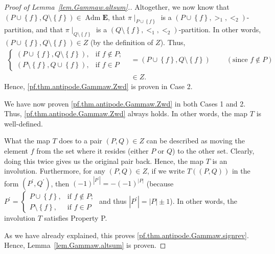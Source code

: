 \documentclass[12pt]{article}
\theoremstyle{plain}
\theoremstyle{definition}
\theoremstyle{remark}
\newcommand{\Adm}{\operatorname{Adm}}
\newcommand{\EE}{{\mathbf{E}}}
\begin{document}
\begin{proof}[Proof of Lemma~\ref{lem.Gammaw.altsum}.]
Altogether, we now know that $\left(  P\cup\left\{  f\right\}  ,Q\setminus
\left\{  f\right\}  \right)  \in \Adm \EE$, that $\pi
\mid_{P\cup\left\{  f\right\}  }$ is a $\left(  P\cup\left\{  f\right\}
,>_{1},<_{2}\right)  $-partition, and that $\pi\mid_{Q\setminus\left\{
f\right\}  }$ is a $\left(  Q\setminus\left\{  f\right\}  ,<_{1},<_{2}\right)
$-partition. In other words, $\left(  P\cup\left\{  f\right\}  ,Q\setminus
\left\{  f\right\}  \right)  \in Z$ (by the definition of $Z$). Thus,
\begin{align*}
\begin{cases}
\left(  P\cup\left\{  f\right\}  ,Q\setminus\left\{  f\right\}  \right)  , &
\text{if }f\notin P;\\
\left(  P\setminus\left\{  f\right\}  ,Q\cup\left\{  f\right\}  \right)  , &
\text{if }f\in P
\end{cases}
& =\left(  P\cup\left\{  f\right\}  ,Q\setminus\left\{  f\right\}  \right)
\ \ \ \ \ \ \ \ \ \ \left(  \text{since }f\notin P\right)  \\
& \in Z.
\end{align*}
Hence, \eqref{pf.thm.antipode.Gammaw.Zwd} is proven in Case 2.

We have now proven \eqref{pf.thm.antipode.Gammaw.Zwd} in both Cases 1 and 2.
Thus, \eqref{pf.thm.antipode.Gammaw.Zwd} always holds. In other words, the map
$T$ is well-defined.


What the map $T$ does to a pair $\left(  P,Q\right)  \in Z$ can be described
as moving the element $f$ from the set where it resides (either $P$ or $Q$) to
the other set. Clearly, doing this twice gives us the original pair back.
Hence, the map $T$ is an involution. Furthermore, for any $\left(  P,Q\right)
\in Z$, if we write $T\left(  \left(  P,Q\right)  \right)  $ in the form
$\left(  P^{\prime},Q^{\prime}\right)  $, then $\left(  -1\right)
^{\left\vert P^{\prime}\right\vert }=-\left(  -1\right)  ^{\left\vert
P\right\vert }$ (because $P^{\prime}=
\begin{cases}
P\cup\left\{  f\right\}  , & \text{if }f\notin P;\\
P\setminus\left\{  f\right\}  , & \text{if }f\in P
\end{cases}
$ and thus
$\left|P^\prime\right| = \left|P\right| \pm 1$).
In other words, the involution $T$ satisfies Property P.

As we have already
explained, this proves \eqref{pf.thm.antipode.Gammaw.signrev}. Hence,
Lemma~\ref{lem.Gammaw.altsum} is proven.
\end{proof}
\end{document}
